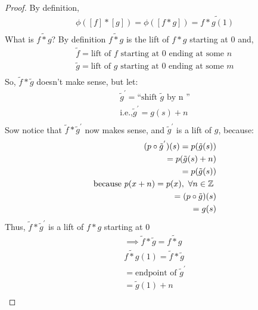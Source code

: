 \begin{itemize}
\begin{proof}
                By definition,
                \begin{align*}
                    \phi([f]*[g])=\phi([f*g])=\tilde{f*g(1)}\\
                \end{align*}
                What is $\tilde{f*g}$? By definition $\tilde{f*g}$ is the lift of $f*g$
                starting at $0$ and,
                \begin{align*}
                    \tilde{f}=\text{lift of $f$ starting at 0 ending at some $n$}\\
                    \tilde{g}=\text{lift of $g$ starting at 0 ending at some $m$}\\
                \end{align*}
                So, $\tilde{f}*\tilde{g}$ doesn't make sense, but let:
                \begin{align*}
                    \tilde{g}^{'}=\text{``shift $\tilde{g}$ by n ''}\\
                    \text{i.e.,}\tilde{g}^{'}=g(s)+n\\
                \end{align*}
                Sow notice that $\tilde{f}*\tilde{g}^{'}$ now makes sense, and $\tilde{g}^{'}$ is a
                lift of $g$, because:
                \begin{align*}
                    (p\circ\tilde{g}^{'})(s)=p(\tilde{g}(s))\\
                    =p(\tilde{g}(s)+n)\\
                    =p(\tilde{g}(s))\\
                    \text{because $p(x+n)=p(x),\ \forall n\in\mathbb{Z}$ }\\
                    =(p\circ\tilde{g})(s)\\
                    =g(s)\\
                \end{align*}
                Thus, $\tilde{f}*\tilde{g}^{'}$ is a lift of $f*g$ starting at $0$\\
                \begin{align*}
                    \implies \tilde{f}*\tilde{g}=\tilde{f*g}\\
                    \tilde{f*g}(1)=\tilde{f}*\tilde{g}\\
                    =\text{endpoint of $\tilde{g}^{'}$}\\
                    =\tilde{g}(1)+n\\

\end{align*}
\end{proof}
\end{itemize}
